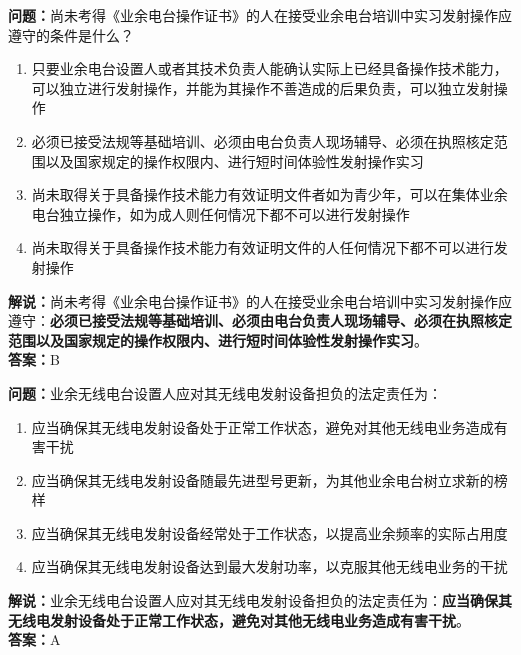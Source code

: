 \bigskip


\noindent\textbf{问题：}尚未考得《业余电台操作证书》的人在接受业余电台培训中实习发射操作应遵守的条件是什么？
\begin{enumerate}[label=\Alph*), leftmargin=3em]
	\item 只要业余电台设置人或者其技术负责人能确认实际上已经具备操作技术能力，可以独立进行发射操作，并能为其操作不善造成的后果负责，可以独立发射操作
	\item 必须已接受法规等基础培训、必须由电台负责人现场辅导、必须在执照核定范围以及国家规定的操作权限内、进行短时间体验性发射操作实习
	\item 尚未取得关于具备操作技术能力有效证明文件者如为青少年，可以在集体业余电台独立操作，如为成人则任何情况下都不可以进行发射操作
	\item 尚未取得关于具备操作技术能力有效证明文件的人任何情况下都不可以进行发射操作
\end{enumerate}
\noindent\textbf{解说：}尚未考得《业余电台操作证书》的人在接受业余电台培训中实习发射操作应遵守：\textbf{必须已接受法规等基础培训、必须由电台负责人现场辅导、必须在执照核定范围以及国家规定的操作权限内、进行短时间体验性发射操作实习}。\\\noindent\textbf{答案：}B


\bigskip


\noindent\textbf{问题：}业余无线电台设置人应对其无线电发射设备担负的法定责任为：
\begin{enumerate}[label=\Alph*), leftmargin=3em]
	\item 应当确保其无线电发射设备处于正常工作状态，避免对其他无线电业务造成有害干扰
	\item 应当确保其无线电发射设备随最先进型号更新，为其他业余电台树立求新的榜样
	\item 应当确保其无线电发射设备经常处于工作状态，以提高业余频率的实际占用度
	\item 应当确保其无线电发射设备达到最大发射功率，以克服其他无线电业务的干扰
\end{enumerate}
\noindent\textbf{解说：}业余无线电台设置人应对其无线电发射设备担负的法定责任为：\textbf{应当确保其无线电发射设备处于正常工作状态，避免对其他无线电业务造成有害干扰}。\\\noindent\textbf{答案：}A


\bigskip


